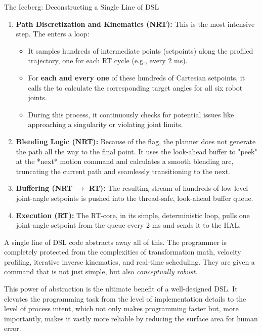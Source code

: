 \begin{principlebox}{The Iceberg: Deconstructing a Single Line of DSL}
\begin{enumerate}
        \item \textbf{Path Discretization and Kinematics (NRT):} This is the most intensive step. The  enters a loop:
            \begin{itemize}
                \item It samples hundreds of intermediate points (setpoints) along the profiled trajectory, one for each RT cycle (e.g., every 2 ms).
                \item For \textbf{each and every one} of these hundreds of Cartesian setpoints, it calls the  to calculate the corresponding target angles for all six robot joints.
                \item During this process, it continuously checks for potential issues like approaching a singularity or violating joint limits.
            \end{itemize}
            
        \item \textbf{Blending Logic (NRT):} Because of the  flag, the planner does not generate the path all the way to the final point. It uses the look-ahead buffer to "peek" at the *next* motion command and calculates a smooth blending arc, truncating the current path and seamlessly transitioning to the next.
        
        \item \textbf{Buffering (NRT $\rightarrow$ RT):} The resulting stream of hundreds of low-level joint-angle setpoints is pushed into the thread-safe, look-ahead buffer queue.
        
        \item \textbf{Execution (RT):} The RT-core, in its simple, deterministic loop, pulls one joint-angle setpoint from the queue every 2 ms and sends it to the HAL.
    \end{enumerate}
    
    A single line of DSL code abstracts away all of this. The programmer is completely protected from the complexities of transformation math, velocity profiling, iterative inverse kinematics, and real-time scheduling. They are given a command that is not just simple, but also \textit{conceptually robust}.
\end{principlebox}

This power of abstraction is the ultimate benefit of a well-designed DSL. It elevates the programming task from the level of implementation details to the level of process intent, which not only makes programming faster but, more importantly, makes it vastly more reliable by reducing the surface area for human error.

